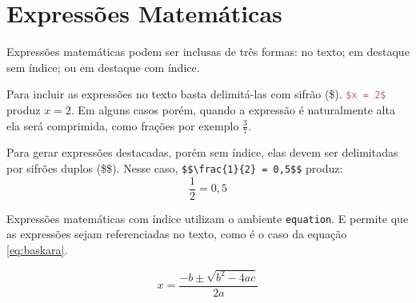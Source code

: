 
\section{Expressões Matemáticas}
\label{sec:exmatematicas}

    Expressões matemáticas podem ser inclusas de três formas:
    no texto; em destaque sem índice; ou em destaque com índice.


    Para incluir as expressões no texto basta delimitá-las com sifrão (\$).
    \lstinline[language=TeX,style=code]|$x = 2$| produz $x = 2$.
    Em alguns casos porém, quando a expressão é naturalmente alta ela será comprimida, como frações por exemplo $\frac{3}{7}$.


    Para gerar expressões destacadas, porém sem índice, elas devem ser delimitadas por sifrões duplos (\$\$).
    Nesse caso, \lstinline[language=teX,style=code]|$$\frac{1}{2} = 0,5$$| produz:
    $$\frac{1}{2} = 0,5$$


    Expressões matemáticas com índice utilizam o ambiente \lstinline[language=TeX,style=code]|equation|.
    E permite que as expressões sejam referenciadas no texto, como é o caso da equação \ref{eq:baskara}.

    \begin{equation}
        x = \frac{-b \pm \sqrt{b^2 - 4ac}}{2a}
        \label{eq:baskara}
    \end{equation}


